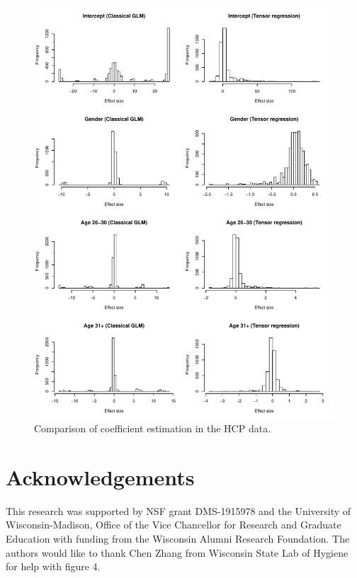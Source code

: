 \documentclass[12pt]{article}
\theoremstyle{plain}
\theoremstyle{definition}
\begin{document}
\begin{figure}[H]
\includegraphics[width=17cm]{compare.pdf}
\caption{Comparison of coefficient estimation in the HCP data.}\label{fig:s1}
\end{figure}



\section*{Acknowledgements}
This research was supported by NSF grant DMS-1915978 and the University of Wisconsin-Madison, Office of the Vice Chancellor for Research and Graduate Education with funding from the Wisconsin Alumni Research Foundation. The authors would like to thank Chen Zhang from Wisconsin State Lab of Hygiene for help with figure 4. 



\end{document}
